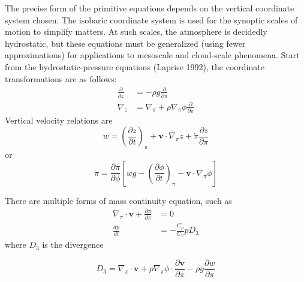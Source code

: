 \documentclass[12pt]{article}
\numberwithin{equation}{section}
\renewcommand{\d}[2]{\frac{d #1}{d #2}}
\newcommand{\dt}[1]{\d{#1}{t}}
\newcommand{\pd}[2]{\frac{\partial #1}{\partial #2}}
\newcommand{\pdt}[1]{\pd{#1}{t}}
\newcommand{\cpocv}{\frac{C_p}{C_V}}
\newcommand{\pdz}[1]{\pd{#1}{\pi}}
\renewcommand{\vec}[1]{\mathbf{#1}}
\newcommand{\grad}[2][\pi]{\nabla_{#1} #2}
\renewcommand{\div}[2][\pi]{\nabla_{#1} \cdot #2}
\begin{document}
The precise form of the primitive equations depends on the vertical coordinate system chosen. The isobaric coordinate system is used for the synoptic scales of motion to simplify matters. At such scales, the atmosphere is decidedly hydrostatic, but these equations must be generalized (using fewer approximations) for applications to mesoscale and cloud-scale phenomena.
Start from the hydrostatic-pressure equations (Laprise 1992), the coordinate transformations are as follows:
\begin{align*}
  \pd{}{z} & = - \rho g \pd{}{\pi} \\
  \nabla_z & = \nabla_\pi + \rho \nabla_\pi \phi \pd{}{\pi}
\end{align*}
Vertical velocity relations are
\begin{equation}
  w = \left(\pdt{z}\right)_\pi + \vec{v} \cdot \nabla_\pi z + \dot{\pi} \pdz{z}
  \label{eqn:vert-speed-relation1}
\end{equation}
or
\begin{equation}
  \dot{\pi} = \pd{\pi}{\phi} \left[w g - \left(\pdt{\phi}\right)_\pi - \vec{v} \cdot \nabla_\pi \phi\right]
  \label{eqn:vert-speed-relation2}
\end{equation}

There are multiple forms of mass continuity equation, such as
\begin{align}
  \div{\vec{v}} + \pd{\dot{\pi}}{\pi} & = 0 \label{eqn:hydrostatic-mass-nondivergent-form} \\
  \dt{p} & = - \cpocv p D_3
\end{align}
where $D_3$ is the divergence

\begin{equation}
  D_3 = \div{\vec{v}} + \rho \grad{\phi} \cdot \pd{\vec{v}}{\pi} - \rho g \pd{w}{\pi}
\end{equation}

\end{document}
